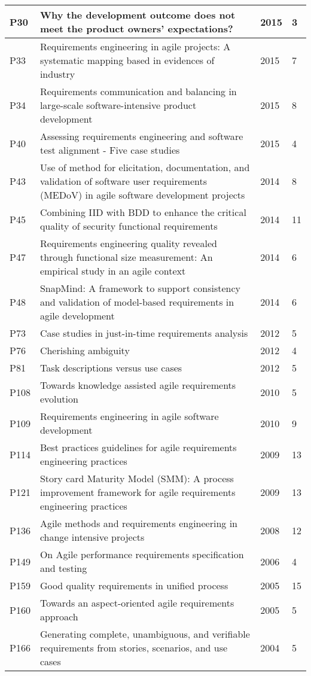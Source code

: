 \begin{table}[!t]
\begin{tabular}{|m{0.4cm}|m{4cm}|m{0.5cm}|m{0.5cm}|}
\hline
P30 & Why the development outcome does not meet the product owners' expectations? & 2015 & 3 \\ 
\hline
P33 & Requirements engineering in agile projects: A systematic mapping based in evidences of industry & 2015 & 7 \\ 
\hline
P34 & Requirements communication and balancing in large-scale software-intensive product development & 2015 & 8 \\ 
\hline
P40 & Assessing requirements engineering and software test alignment - Five case studies & 2015 & 4 \\
\hline
P43 & Use of method for elicitation, documentation, and validation of software user requirements (MEDoV) in agile software development projects & 2014 & 8 \\ 
\hline
P45 & Combining IID with BDD to enhance the critical quality of security functional requirements & 2014 & 11 \\ 
\hline
P47 & Requirements engineering quality revealed through functional size measurement: An empirical study in an agile context & 2014 & 6 \\ 
\hline
P48 & SnapMind: A framework to support consistency and validation of model-based requirements in agile development & 2014 & 6 \\ 
\hline
P73 & Case studies in just-in-time requirements analysis & 2012 & 5 \\ 
\hline
P76 & Cherishing ambiguity & 2012 & 4 \\ 
\hline
P81 & Task descriptions versus use cases & 2012 & 5 \\ 
\hline
P108 & Towards knowledge assisted agile requirements evolution & 2010 & 5 \\ 
\hline
P109 & Requirements engineering in agile software development & 2010 & 9 \\ 
\hline
P114 & Best practices guidelines for agile requirements engineering practices & 2009 & 13 \\ 
\hline
P121 & Story card Maturity Model (SMM): A process improvement framework for agile requirements engineering practices & 2009 & 13 \\ 
\hline
P136 & Agile methods and requirements engineering in change intensive projects & 2008 & 12 \\ 
\hline
P149 & On Agile performance requirements specification and testing & 2006 & 4 \\ 
\hline
P159 & Good quality requirements in unified process & 2005 & 15 \\ 
\hline
P160 & Towards an aspect-oriented agile requirements approach & 2005 & 5 \\ 
\hline
P166 & Generating complete, unambiguous, and verifiable requirements from stories, scenarios, and use cases & 2004 & 5 \\ 
\hline
\end{tabular}
\end{table}